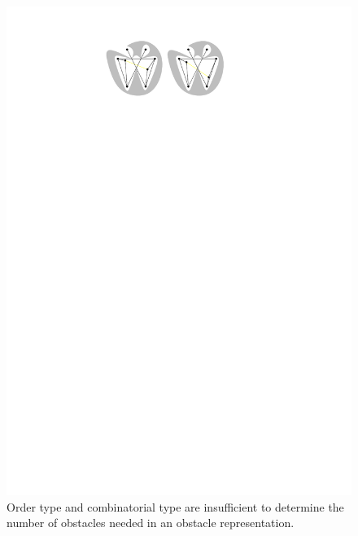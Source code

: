 \documentclass{patmorin}
\begin{document}
\begin{figure}
  \begin{center}
    \includegraphics{order-type}
  \end{center}
  \caption{Order type and combinatorial type are insufficient to determine 
      the number of obstacles needed in an obstacle representation.}
\end{figure}
\end{document}
